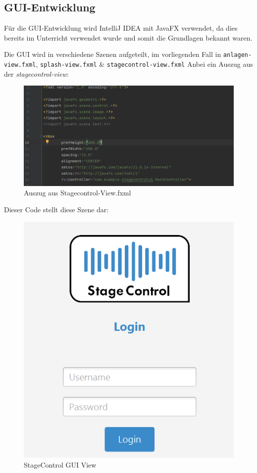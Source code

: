 \newpage
\subsection{GUI-Entwicklung}
Für die GUI-Entwicklung wird IntelliJ IDEA mit JavaFX verwendet, da dies bereits im Unterricht verwendet wurde und somit die Grundlagen bekannt waren.

Die GUI wird in verschiedene Szenen aufgeteilt, im vorliegenden Fall in \texttt{anlagen-view.fxml}, \texttt{splash-view.fxml} \& \texttt{stagecontrol-view.fxml}
Anbei ein Auszug aus der \textit{stagecontrol-view}:

\begin{figure}[H]
	\centering
	\includegraphics[width=0.9\linewidth]{images/stagecontrol-view.png}
	\caption[Auszug aus Stagecontrol-View.fxml]{Auszug aus Stagecontrol-View.fxml}
	\label{fig:Stagecontrolview}
\end{figure}

\newpage
Dieser Code stellt diese Szene dar:
\begin{figure}[H]
	\centering
	\includegraphics[width=0.7\linewidth]{images/StagecontrolViewGUI.png}
	\caption[StageControl GUI View]{StageControl GUI View}
	\label{fig:StageControlViewGUI}
\end{figure}


